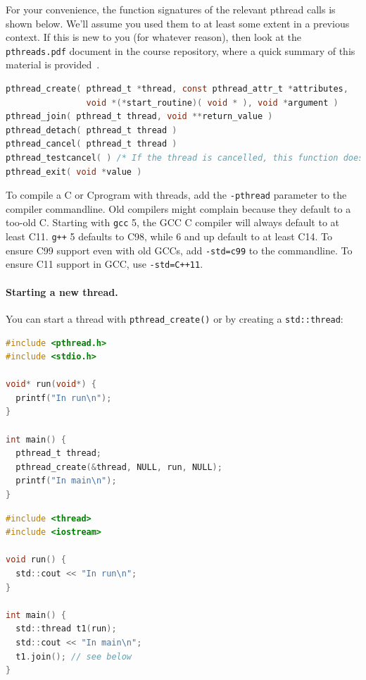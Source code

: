 \documentclass[a4paper]{report}
\newcommand{\CPP}{C\nolinebreak\hspace{-.05em}\raisebox{.4ex}{\tiny\bf +}\nolinebreak\hspace{-.10em}\raisebox{.4ex}{\tiny\bf +}}
\def\CPP{{C\nolinebreak[4]\hspace{-.05em}\raisebox{.4ex}{\tiny\bf ++}}}
\begin{document}
For your convenience, the function signatures of the relevant pthread calls is shown below. We'll assume you used them to at least some extent in a previous context. If this is new to you (for whatever reason), then look at the \texttt{pthreads.pdf} document in the course repository, where a quick summary of this material is provided~\cite{pthreads}.

\begin{lstlisting}[language=C]
pthread_create( pthread_t *thread, const pthread_attr_t *attributes,
                void *(*start_routine)( void * ), void *argument )
pthread_join( pthread_t thread, void **return_value )
pthread_detach( pthread_t thread )
pthread_cancel( pthread_t thread )
pthread_testcancel( ) /* If the thread is cancelled, this function does not return (thread terminated) */
pthread_exit( void *value )
\end{lstlisting}

To compile a C or \CPP program with threads, add the {\tt -pthread}
parameter to the compiler commandline. Old compilers might complain
because they default to a too-old C. Starting with {\tt gcc} 5, the
GCC C compiler will always default to at least C11. {\tt g++} 5
defaults to \CPP 98, while 6 and up default to at least \CPP 14. To
ensure C99 support even with old GCCs, add \texttt{-std=c99} to the
commandline. To ensure \CPP11 support in GCC, use \verb!-std=C++11!.




\paragraph{Starting a new thread.} You can start a thread with
\verb+pthread_create()+ or by creating a \verb+std::thread+:

{\small
  \begin{minipage}{.55\textwidth}
\begin{lstlisting}[language=C]
#include <pthread.h>
#include <stdio.h>

void* run(void*) {
  printf("In run\n");
}

int main() {
  pthread_t thread;
  pthread_create(&thread, NULL, run, NULL);
  printf("In main\n");
}
\end{lstlisting}
  \end{minipage} 
  \begin{minipage}{.4\textwidth}
\begin{lstlisting}[language=C]
#include <thread>
#include <iostream>

void run() {
  std::cout << "In run\n";
}

int main() {
  std::thread t1(run);
  std::cout << "In main\n";
  t1.join(); // see below
}
\end{lstlisting}
  \end{minipage}
}
\end{document}
